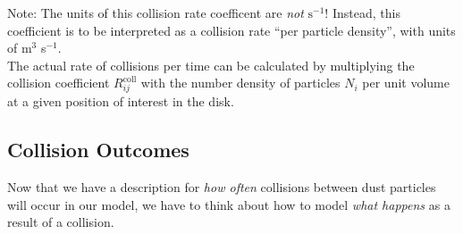         Note: The units of this collision rate coefficent are \textit{not} $\text{s}^{-1}$! 
        Instead, this coefficient is to be interpreted as a collision rate ``per particle density'',
        with units of m$^3$ s$^{-1}$. \\

        The actual rate of collisions per time can be calculated by multiplying the 
        collision coefficient $R_{ij}^\text{coll}$ with the number density of particles $N_i$ 
        per unit volume at a given position of interest in the disk. 

    \subsection{Collision Outcomes}
        \label{sec:definition_of_reaction_rate_coefficient}

        Now that we have a description for \textit{how often} collisions between dust particles 
        will occur in our model, we have to think about how to model \textit{what happens} as a 
        result of a collision. \\

